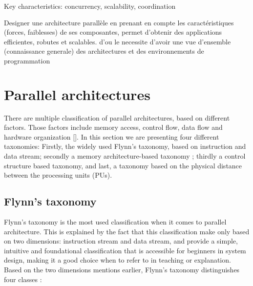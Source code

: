 Key characteristics: concurrency, scalability, coordination

Designer une architecture parallèle en prenant en compte les caractéristiques (forces, faiblesses) de ses composantes, permet d'obtenir des applications efficientes, robutes et scalables. d'ou le necessite d'avoir une vue d'ensemble (connaissance generale) des architectures et des environnements de programmation






\section{Parallel architectures}



There are multiple classification of parallel architectures, based on different factors. Those factors include memory access, control flow, data flow and hardware organization [].  In this section we are presenting four different taxonomies: Firstly, the widely used Flynn’s taxonomy, based on instruction and data stream; secondly a memory architecture-based taxonomy ; thirdly a control structure  based taxonomy, and last, a taxonomy based on the physical distance between the processing units (PUs).


\subsection{Flynn's taxonomy}

Flynn’s taxonomy is the most used classification when it comes to parallel architecture. This is explained by the fact that this classification make only based on two dimensions: instruction stream and data stream, and provide a simple, intuitive and foundational classification that is accessible for beginners in system design, making it a good choice when to refer to in teaching or explanation. Based on the two dimensions mentions earlier, Flynn’s taxonomy distinguishes four classes :

